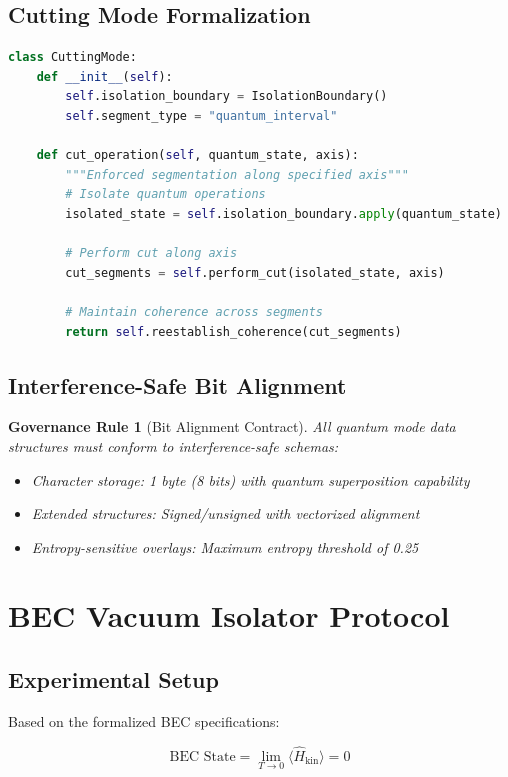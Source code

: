 \documentclass[12pt]{article}
\newtheorem{governance}{Governance Rule}
\begin{document}
\subsection{Cutting Mode Formalization}
\begin{lstlisting}[language=Python, caption=Quantum Cutting Mode Implementation]
class CuttingMode:
    def __init__(self):
        self.isolation_boundary = IsolationBoundary()
        self.segment_type = "quantum_interval"
        
    def cut_operation(self, quantum_state, axis):
        """Enforced segmentation along specified axis"""
        # Isolate quantum operations
        isolated_state = self.isolation_boundary.apply(quantum_state)
        
        # Perform cut along axis
        cut_segments = self.perform_cut(isolated_state, axis)
        
        # Maintain coherence across segments
        return self.reestablish_coherence(cut_segments)
\end{lstlisting}

\subsection{Interference-Safe Bit Alignment}
\begin{governance}[Bit Alignment Contract]
All quantum mode data structures must conform to interference-safe schemas:
\begin{itemize}
\item Character storage: 1 byte (8 bits) with quantum superposition capability
\item Extended structures: Signed/unsigned with vectorized alignment
\item Entropy-sensitive overlays: Maximum entropy threshold of 0.25
\end{itemize}
\end{governance}

\section{BEC Vacuum Isolator Protocol}

\subsection{Experimental Setup}
Based on the formalized BEC specifications:

\begin{equation}
\boxed{
\text{BEC State} = \lim_{T \to 0} \langle \hat{H}_{\text{kin}} \rangle = 0
}
\end{equation}
\end{document}
